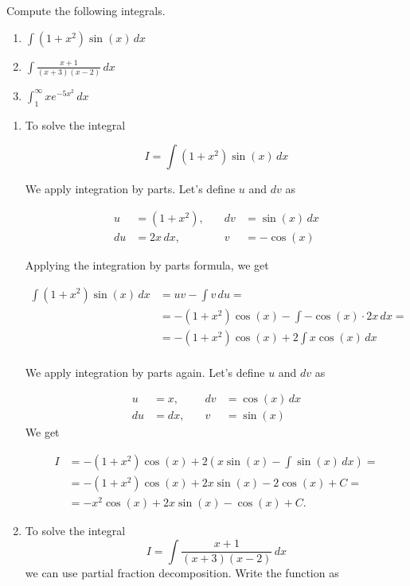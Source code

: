 \documentclass[11.0pt]{exam}
\begin{document}
\begin{questions}
\question[3]
Compute the following integrals.
\begin{enumerate}
    \item $\displaystyle \int (1+x^2) \sin(x)\, dx$
    \item $\displaystyle \int \frac{x+1}{(x+3)(x-2)} \, dx$
    \item $\displaystyle \int_1^{\infty} xe^{-5x^2} \, dx$
\end{enumerate}

\begin{solution}[0cm]
\begin{enumerate}
\item To solve the integral

\[
I=\int (1 + x^2) \sin(x) \, dx
\]

We apply integration by parts. Let's define \( u \) and \( dv \) as

\[
\begin{aligned}
u &= (1 + x^2), \quad &dv &= \sin(x) \, dx \\
du &= 2x \, dx, \quad &v &= -\cos(x)
\end{aligned}
\]

Applying the integration by parts formula, we get

\[
\begin{aligned}
\int (1 + x^2) \sin(x) \, dx &= uv - \int v \, du =\\
&= -(1 + x^2)\cos(x) - \int -\cos(x) \cdot 2x \, dx=\\
&= -(1 + x^2)\cos(x) + 2 \int x \cos(x) \, dx \\
\end{aligned}
\]

We apply integration by parts again. Let's define \( u \) and \( dv \) as

\[
\begin{aligned}
u &= x, \quad &dv &= \cos(x) \, dx \\
du &= dx, \quad &v &= \sin(x)
\end{aligned}
\]
We get 

\[
\begin{aligned}
I &= -(1 + x^2)\cos(x) + 2\left(x\sin(x) - \int \sin(x) \, dx\right)=\\
&= -(1 + x^2)\cos(x) + 2x\sin(x) - 2\cos(x) + C=\\
&= - x^2\cos(x) + 2x\sin(x) - \cos(x) + C.
\end{aligned}
\]

\item To solve the integral \[
I=\int \frac{x + 1}{(x + 3)(x - 2)} \, dx
\]
we can use partial fraction decomposition. Write the function as


\end{enumerate}
\end{solution}
\end{questions}
\end{document}
